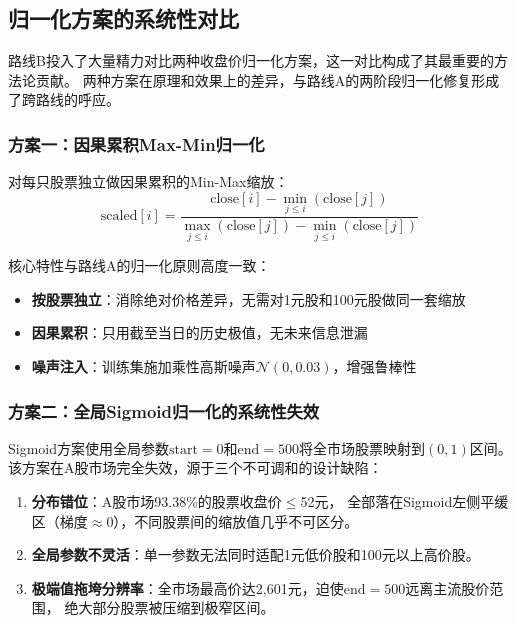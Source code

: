 \documentclass[12pt,a4paper]{ctexart}
\begin{document}
\subsection{归一化方案的系统性对比}

路线B投入了大量精力对比两种收盘价归一化方案，这一对比构成了其最重要的方法论贡献。
两种方案在原理和效果上的差异，与路线A的两阶段归一化修复形成了跨路线的呼应。

\subsubsection{方案一：因果累积Max-Min归一化}

对每只股票独立做因果累积的Min-Max缩放：
\begin{equation}
\text{scaled}[i] = \frac{\text{close}[i] - \min_{j \le i}(\text{close}[j])}
                         {\max_{j \le i}(\text{close}[j]) - \min_{j \le i}(\text{close}[j])}
\end{equation}

核心特性与路线A的归一化原则高度一致：
\begin{itemize}[leftmargin=*]
    \item \textbf{按股票独立}：消除绝对价格差异，无需对1元股和100元股做同一套缩放
    \item \textbf{因果累积}：只用截至当日的历史极值，无未来信息泄漏
    \item \textbf{噪声注入}：训练集施加乘性高斯噪声$\mathcal{N}(0, 0.03)$，增强鲁棒性
\end{itemize}

\subsubsection{方案二：全局Sigmoid归一化的系统性失效}

Sigmoid方案使用全局参数$\text{start}=0$和$\text{end}=500$将全市场股票映射到$(0,1)$区间。
该方案在A股市场完全失效，源于三个不可调和的设计缺陷：

\begin{enumerate}[leftmargin=*]
    \item \textbf{分布错位}：A股市场93.38\%的股票收盘价$\le$52元，
          全部落在Sigmoid左侧平缓区（梯度$\approx$0），不同股票间的缩放值几乎不可区分。
    \item \textbf{全局参数不灵活}：单一参数无法同时适配1元低价股和100元以上高价股。
    \item \textbf{极端值拖垮分辨率}：全市场最高价达2,601元，迫使$\text{end}=500$远离主流股价范围，
          绝大部分股票被压缩到极窄区间。
\end{enumerate}
\end{document}
